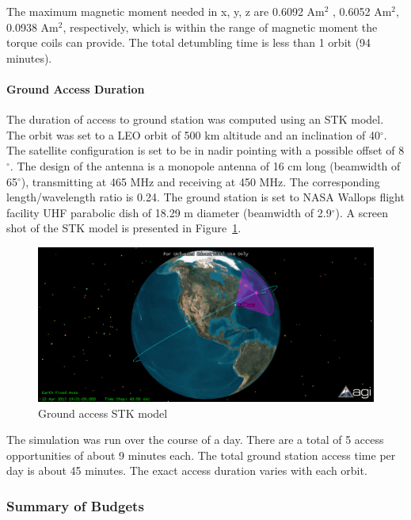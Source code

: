 \documentclass[12pt]{article}
\begin{document}
			The maximum magnetic moment needed in x, y, z are 0.6092 Am$^2$ , 0.6052 Am$^2$, 0.0938 Am$^2$, respectively, which is within the range of magnetic moment the torque coils can provide. The total detumbling time is less than 1 orbit (94 minutes). 
			
			\paragraph{Ground Access Duration}
			The duration of access to ground station was computed using an STK model. The orbit was set to a LEO orbit of 500 km altitude and an inclination of 40$^\circ$. The satellite configuration is set to be in nadir pointing with a possible offset of 8$^\circ$. The design of the antenna is a monopole antenna of 16 cm long (beamwidth of 65$^\circ$), transmitting at 465 MHz and receiving at 450 MHz. The corresponding length/wavelength ratio is 0.24. The ground station is set to NASA Wallops flight facility UHF parabolic dish of 18.29 m diameter (beamwidth of 2.9$^\circ$). A screen shot of the STK model is presented in Figure~\ref{fig:ADCS_STK}. 
			
			\begin{figure}[!ht]
				\centering
				\includegraphics[scale=0.8]{images/ADCS_STK.png}
				\caption{Ground access STK model}
				\label{fig:ADCS_STK}
			\end{figure}
			
			The simulation was run over the course of a day. There are a total of 5 access opportunities of about 9 minutes each. The total ground station access time per day is about 45 minutes. The exact access duration varies with each orbit. 
		
			\subsubsection{Summary of Budgets}
			
\end{document}
